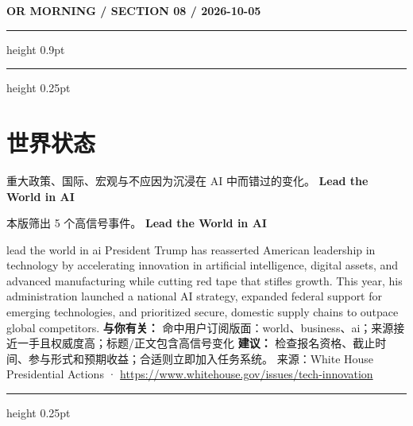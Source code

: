 \documentclass[10.5pt]{ctexart}
\begin{document}
\newpage
{\small\bfseries OR MORNING / SECTION 08 / 2026-10-05}
\vspace{2mm}
\hrule height 0.9pt
\vspace{1.5mm}
\hrule height 0.25pt
\vspace{4mm}
\section*{世界状态}
{\color{ormuted} 重大政策、国际、宏观与不应因为沉浸在 AI 中而错过的变化。}
\vspace{2mm}
{\LARGE\bfseries Lead the World in AI}\par
\vspace{1mm}
{\color{ormuted} 本版筛出 5 个高信号事件。}
\vspace{3mm}
{\Large\bfseries Lead the World in AI}\par
lead the world in ai President Trump has reasserted American leadership in technology by accelerating innovation in artificial intelligence, digital assets, and advanced manufacturing while cutting red tape that stifles growth. This year, his administration launched a national AI strategy, expanded federal support for emerging technologies, and prioritized secure, domestic supply chains to outpace global competitors.
\textbf{与你有关：} 命中用户订阅版面：world、business、ai；来源接近一手且权威度高；标题/正文包含高信号变化
\textbf{建议：} 检查报名资格、截止时间、参与形式和预期收益；合适则立即加入任务系统。
{\footnotesize\color{ormuted} 来源：White House Presidential Actions · \url{https://www.whitehouse.gov/issues/tech-innovation}}
\vspace{4mm}
\hrule height 0.25pt
\vspace{3mm}
\end{document}
